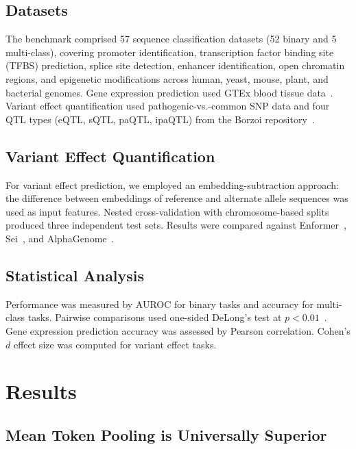 \documentclass[11pt]{article}
\begin{document}
\subsection{Datasets}

The benchmark comprised 57 sequence classification datasets (52 binary and 5 multi-class), covering promoter identification, transcription factor binding site (TFBS) prediction, splice site detection, enhancer identification, open chromatin regions, and epigenetic modifications across human, yeast, mouse, plant, and bacterial genomes.  Gene expression prediction used GTEx blood tissue data~\citep{gtex2020gtex}.  Variant effect quantification used pathogenic-vs.-common SNP data and four QTL types (eQTL, sQTL, paQTL, ipaQTL) from the Borzoi repository~\citep{liao2024borzoi}.

\subsection{Variant Effect Quantification}

For variant effect prediction, we employed an embedding-subtraction approach: the difference between embeddings of reference and alternate allele sequences was used as input features.  Nested cross-validation with chromosome-based splits produced three independent test sets.  Results were compared against Enformer~\citep{avsec2021enformer}, Sei~\citep{chen2022sei}, and AlphaGenome~\citep{cheng2025alphagenome}.

\subsection{Statistical Analysis}

Performance was measured by AUROC for binary tasks and accuracy for multi-class tasks.  Pairwise comparisons used one-sided DeLong's test at $p < 0.01$~\citep{delong1988comparing}.  Gene expression prediction accuracy was assessed by Pearson correlation.  Cohen's $d$ effect size was computed for variant effect tasks.

\section{Results}

\subsection{Mean Token Pooling is Universally Superior}
\end{document}
